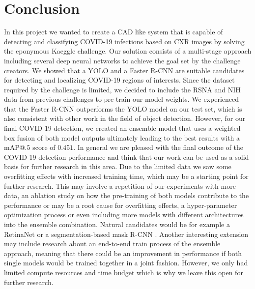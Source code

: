 \chapter{Conclusion}\label{chapter:conclusion}

In this project we wanted to create a \ac{CAD} like system that is capable of detecting and classifying COVID-19 infections based on \acl{CXR} images by solving the eponymous Kaeggle challenge. Our solution consists of a multi-stage approach including several deep neural networks to achieve the goal set by the challenge creators. We showed that a \ac{YOLO} and a Faster \ac{R-CNN} are suitable candidates for detecting and localizing COVID-19 regions of interests. Since the dataset required by the challenge is limited, we decided to include the \ac{RSNA} and \ac{NIH} data from previous challenges to pre-train our model weights.
We experienced that the Faster \ac{R-CNN} outperforms the \ac{YOLO} model on our test set, which is also consistent with other work in the field of object detection. However, for our final COVID-19 detection, we created an ensemble model that uses a weighted box fusion of both model outputs ultimately leading to the best results with a \ac{mAP}@$.5$ score of $0.451$. In general we are pleased with the final outcome of the COVID-19 detection performance and think that our work can be used as a solid basis for further research in this area. Due to the limited data we saw some overfitting effects with increased training time, which may be a starting point for further research. This may involve a repetition of our experiments with more data, an ablation study on how the pre-training of both models contribute to the performance or may be a root cause for overfitting effects, a hyper-parameter optimization process or even including more models with different architectures into the ensemble combination. Natural candidates would be for example a RetinaNet \autocite{lin_focal_2018} or a segmentation-based mask R-CNN \autocite{maskRcnn}.
Another interesting extension may include research about an end-to-end train process of the ensemble approach, meaning that there could be an improvement in performance if both single models would be trained together in a joint fashion. However, we only had limited compute resources and time budget which is why we leave this open for further research.

